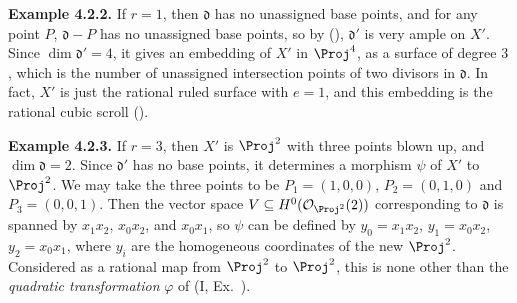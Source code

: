 {\medskip
\noindent\hypertarget{result-V-4.2.2}{}\textbf{Example 4.2.2.} If $r=1$, then $\mathfrak d$ has no unassigned base points, and for any point $P$, $\mathfrak d-P$ has no unassigned base points, so by (), $\mathfrak d'$ is very ample on $X'$. Since $\dim\mathfrak d'=4$, it gives an embedding of $X'$ in $\Proj^4$, as a surface of degree $3$, which is the number of unassigned intersection points of two divisors in $\mathfrak d$. In fact, $X'$ is just the rational ruled surface with $e=1$, and this embedding is the rational cubic scroll ().

\medskip
\noindent\hypertarget{result-V-4.2.3}{}\textbf{Example 4.2.3.} If $r=3$, then $X'$ is $\Proj^2$ with three points blown up, and $\dim\mathfrak d=2$. Since $\mathfrak d'$ has no base points, it determines a morphism $\psi$ of $X'$ to $\Proj^2$. We may take the three points to be $P_1=(1,0,0)$, $P_2=(0,1,0)$ and $P_3=(0,0,1)$. Then the vector space $V\subseteq H^0(\mathcal O_{\Proj^2}(2))$ corresponding to $\mathfrak d$ is spanned by $x_1x_2$, $x_0x_2$, and $x_0x_1$, so $\psi$ can be defined by $y_0=x_1x_2$, $y_1=x_0x_2$, $y_2=x_0x_1$, where $y_i$ are the homogeneous coordinates of the new $\Proj^2$. Considered as a rational map from $\Proj^2$ to $\Proj^2$, this is none other than the \emph{quadratic transformation} $\varphi$ of (I, Ex.~).
}
